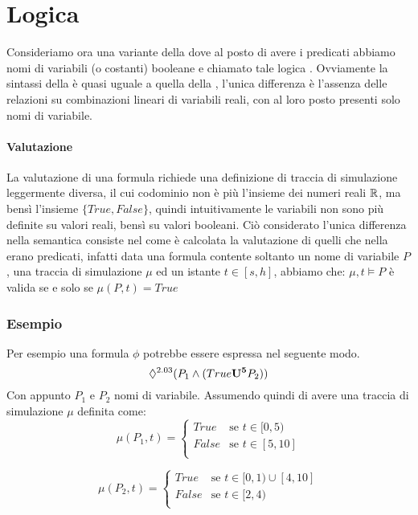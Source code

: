 \documentclass[10pt,a4paper]{article}
\begin{document}
	\section{Logica \BLTLstar}
	Consideriamo ora una variante della \BLTL{} dove al posto di avere i predicati abbiamo nomi di variabili (o costanti) booleane e chiamato tale logica \BLTLstar{}. Ovviamente la sintassi della \BLTLstar{} è quasi uguale a quella della \BLTL{}, l'unica differenza è l'assenza delle relazioni su combinazioni lineari di variabili reali, con al loro posto presenti solo nomi di variabile.
	 \paragraph{Valutazione}
	\begin{multicols}{2}
		 La valutazione di una formula \BLTLstar{} richiede una definizione di traccia di simulazione leggermente diversa, il cui codominio non è più l'insieme dei numeri reali $\mathbb{R}$, ma bensì l'insieme $\{True,False\}$, quindi intuitivamente le variabili non sono più definite su valori reali, bensì su valori booleani. Ciò considerato l'unica differenza nella semantica consiste nel come è calcolata la valutazione di quelli che nella \BLTL{} erano predicati, infatti data una formula contente soltanto un nome di variabile $P$, una traccia di simulazione $\mu$ ed un istante $t\in [s,h]$, abbiamo che:
		$\mu,t \models P$ è valida se e solo se $\mu(P,t) = True$
	\end{multicols} 

	 \subsubsection*{Esempio}
	Per esempio una formula \BLTLstar{} $\phi$ potrebbe essere espressa nel seguente modo.
	$$
	\Diamond^{2.03}(P_1 \land (True \mathbf{U^{5}} P_2))
	$$
	Con appunto $P_1$ e $P_2$ nomi di variabile.
	Assumendo quindi di avere una traccia di simulazione $\mu$ definita come:
	$$
	\mu(P_1,t) = 
	\begin{cases}
	True								 	& \text{se } t\in[0,5)\\
	False									& \text{se } t\in[5,10]\\
	\end{cases}
	$$
	
	$$
	\mu(P_2,t) = 
	\begin{cases}
	True								 	& \text{se } t\in[0,1)\cup[4,10]\\
	False									& \text{se } t\in[2,4)\\
	\end{cases}
	$$
	
\end{document}
